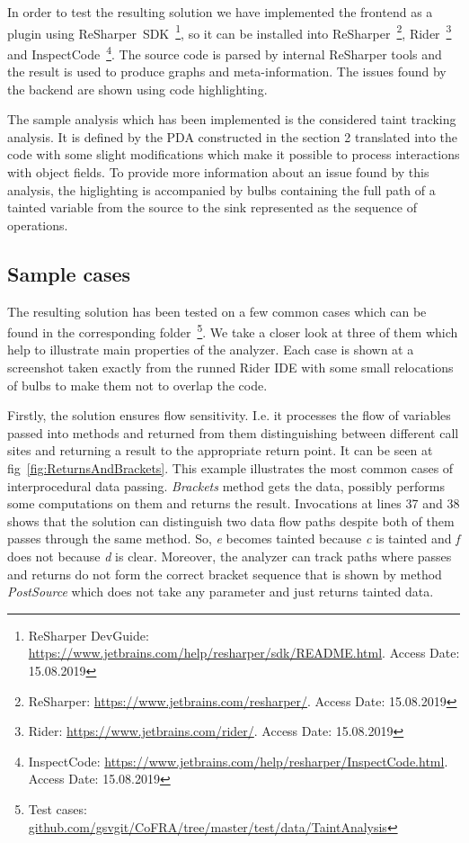 In order to test the resulting solution we have implemented the frontend as a plugin using ReSharper~SDK~\footnote{ReSharper DevGuide: \url{https://www.jetbrains.com/help/resharper/sdk/README.html}. Access Date: 15.08.2019}, so it can be installed into ReSharper~\footnote{ReSharper: \url{https://www.jetbrains.com/resharper/}. Access Date: 15.08.2019}, Rider~\footnote{Rider: \url{https://www.jetbrains.com/rider/}. Access Date: 15.08.2019} and InspectCode~\footnote{InspectCode: \url{https://www.jetbrains.com/help/resharper/InspectCode.html}. Access Date: 15.08.2019}.
The source code is parsed by internal ReSharper tools and the result is used to produce graphs and meta-information.
The issues found by the backend are shown using code highlighting.

The sample analysis which has been implemented is the considered taint tracking analysis.
It is defined by the PDA constructed in the section 2 translated into the code with some slight modifications which make it possible to process interactions with object fields.
To provide more information about an issue found by this analysis, the higlighting is accompanied by bulbs containing the full path of a tainted variable from the source to the sink represented as the sequence of operations.

\subsection{Sample cases}

The resulting solution has been tested on a few common cases which can be found in the corresponding folder~\footnote{Test cases: \url{github.com/gsvgit/CoFRA/tree/master/test/data/TaintAnalysis}}.
We take a closer look at three of them which help to illustrate main properties of the analyzer.
Each case is shown at a screenshot taken exactly from the runned Rider IDE with some small relocations of bulbs to make them not to overlap the code.

Firstly, the solution ensures flow sensitivity. I.e. it processes the flow of variables passed into methods and returned from them distinguishing between different call sites and returning a result to the appropriate return point.
It can be seen at fig~\ref{fig:ReturnsAndBrackets}.
This example illustrates the most common cases of interprocedural data passing.
\textit{Brackets} method gets the data, possibly performs some computations on them and returns the result.
Invocations at lines 37 and 38 shows that the solution can distinguish two data flow paths despite both of them passes through the same method.
So, \textit{e} becomes tainted because \textit{c} is tainted and \textit{f} does not because \textit{d} is clear.
Moreover, the analyzer can track paths where passes and returns do not form the correct bracket sequence that is shown by method \textit{PostSource} which does not take any parameter and just returns tainted data.

